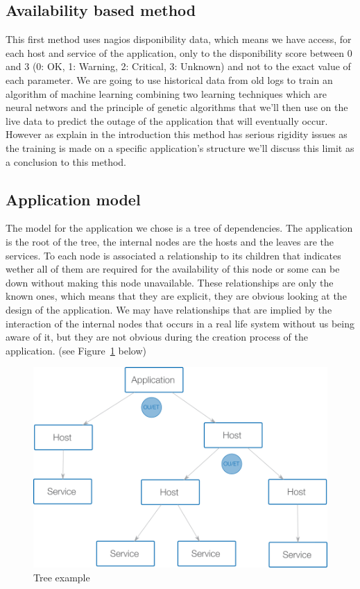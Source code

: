 \documentclass[10pt,a4paper,oneside]{article}
\begin{document}
\begin{multicols}{2}
\section{Availability based method}
This first method uses nagios disponibility data, which means we have access, for each host and service of the application, only to the disponibility score between 0 and 3 (0: OK, 1: Warning, 2: Critical, 3: Unknown) and not to the exact value of each parameter. We are going to use historical data from old logs to train an algorithm of machine learning combining two learning techniques which are neural networs and the principle of genetic algorithms that we'll then use on the live data to predict the outage of the application that will eventually occur. However as explain in the introduction this method has serious rigidity issues as the training is made on a specific application's structure we'll discuss this limit as a conclusion to this method.
\subsection{Application model}
The model for the application we chose is a tree of dependencies. The application is the root of the tree, the internal nodes are the hosts and the leaves are the services. To each node is associated a relationship to its children that indicates wether all of them are required for the availability of this node or some can be down without making this node unavailable. These relationships are only the known ones, which means that they are explicit, they are obvious looking at the design of the application. We may have relationships that are implied by the interaction of the internal nodes that occurs in a real life system without us being aware of it, but they are not obvious during the creation process of the application. (see Figure~\ref{exampletree} below)
\end{multicols}

\vspace{0.8cm}

\begin{figure}
\centering
\includegraphics[scale=0.5]{./images/PNG/abrerelation.png}
\caption{Tree example}
\label{exampletree}
\end{figure}
\end{document}

